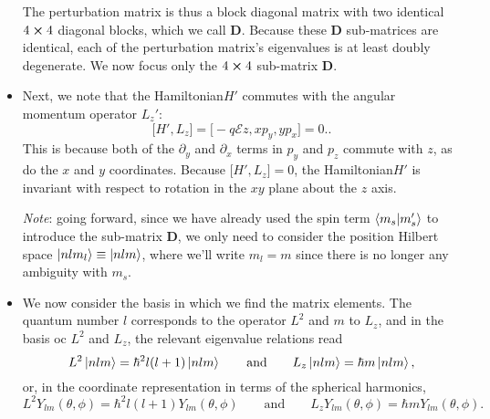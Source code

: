 \documentclass[11pt, a4paper]{article}
\newcommand{\eqtext}[1]{\qquad \text{#1} \qquad}
\newcommand{\Ham}{Hamiltonian\xspace}
\newcommand{\mat}[1]{\mathbf{#1}} %
\newcommand{\E}{\mathcal{E}}  %
\begin{document}
\begin{itemize}
	The perturbation matrix is thus a block diagonal matrix with two identical $ 4 \cross 4 $ diagonal blocks, which we call $ \mat{D} $. Because these $ \mat{D} $ sub-matrices are identical, each of the perturbation matrix's eigenvalues is at least doubly degenerate. We now focus only the $ 4\cross 4 $ sub-matrix $ \mat{D} $. 
	
	\item Next, we note that the \Ham $ H' $ commutes with the angular momentum operator $ L_{z}' $:
	\begin{equation*}
		\big[H', L_{z}\big] = \big[- q \E z, xp_{y}, yp_{x}\big] = 0..
	\end{equation*}
	This is because both of the $ \partial_{y} $ and $ \partial_{x} $ terms in $ p_{y} $ and $ p_{z} $ commute with $ z $, as do the $ x $ and $ y $ coordinates. Because $ \big[H', L_{z}\big] = 0 $, the \Ham $ H' $ is invariant with respect to rotation in the $ xy $ plane about the $ z $ axis. 
	
	\textit{Note}: going forward, since we have already used the spin term $ \braket{m_{s}}{m_{s}'} $ to introduce the sub-matrix $ \mat{D} $, we only need to consider the position Hilbert space $ \ket{nlm_{l}} \equiv \ket{nlm} $, where we'll write $ m_{l} = m $ since there is no longer any ambiguity with $ m_{s} $.
	
	\item We now consider the basis in which we find the matrix elements. The quantum number $ l $ corresponds to the operator $ L^{2} $ and $ m $ to $ L_{z} $, and in the basis oc $ L^{2} $ and $ L_{z} $, the relevant eigenvalue relations read
	\begin{equation*}
		L^{2}\ket{nlm} = \hbar^{2} l (l+1)\ket{nlm} \eqtext{and} L_{z}\ket{nlm} = \hbar m\ket{nlm},
	\end{equation*}
	or, in the coordinate representation in terms of the spherical harmonics,
	\begin{equation*}
		L^{2}Y_{lm}(\theta, \phi) =  \hbar^{2} l (l+1)Y_{lm}(\theta, \phi) \eqtext{and} L_{z}Y_{lm}(\theta, \phi) =  \hbar m Y_{lm}(\theta, \phi).
	\end{equation*}
	

\end{itemize}
\end{document}
